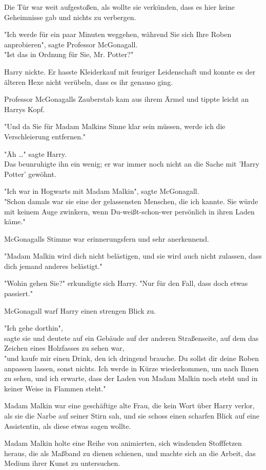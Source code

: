 {Die Tür war weit aufgestoßen, als wollte sie verkünden, dass es hier keine Geheimnisse gab und nichts zu verbergen.

"Ich werde für ein paar Minuten weggehen, während Sie sich Ihre Roben anprobieren", sagte Professor McGonagall.\\ "Ist das in Ordnung für Sie, Mr. Potter?"

Harry nickte. Er hasste Kleiderkauf mit feuriger Leidenschaft und konnte es der älteren Hexe nicht verübeln, dass es ihr genauso ging.

Professor McGonagalls Zauberstab kam aus ihrem Ärmel und tippte leicht an Harrys Kopf.

"Und da Sie für Madam Malkins Sinne klar sein müssen, werde ich die Verschleierung entfernen."

"Äh …" sagte Harry.\\ Das beunruhigte ihn ein wenig; er war immer noch nicht an die Sache mit 'Harry Potter' gewöhnt.

"Ich war in Hogwarts mit Madam Malkin", sagte McGonagall.\\ "Schon damals war sie eine der gelassensten Menschen, die ich kannte. Sie würde mit keinem Auge zwinkern, wenn Du-weißt-schon-wer persönlich in ihren Laden käme."

McGonagalls Stimme war erinnerungsfern und sehr anerkennend.

"Madam Malkin wird dich nicht belästigen, und sie wird auch nicht zulassen, dass dich jemand anderes belästigt."

"Wohin gehen Sie?" erkundigte sich Harry. "Nur für den Fall, dass doch etwas passiert."

McGonagall warf Harry einen strengen Blick zu.

"Ich gehe dorthin",\\ sagte sie und deutete auf ein Gebäude auf der anderen Straßenseite, auf dem das Zeichen eines Holzfasses zu sehen war,\\ "und kaufe mir einen Drink, den ich dringend brauche. Du sollst dir deine Roben anpassen lassen, sonst nichts. Ich werde in Kürze wiederkommen, um nach Ihnen zu sehen, und ich erwarte, dass der Laden von Madam Malkin noch steht und in keiner Weise in Flammen steht."

Madam Malkin war eine geschäftige alte Frau, die kein Wort über Harry verlor, als sie die Narbe auf seiner Stirn sah, und sie schoss einen scharfen Blick auf eine Assistentin, als diese etwas sagen wollte.

Madam Malkin holte eine Reihe von animierten, sich windenden Stofffetzen heraus, die als Maßband zu dienen schienen, und machte sich an die Arbeit, das Medium ihrer Kunst zu untersuchen.

}
